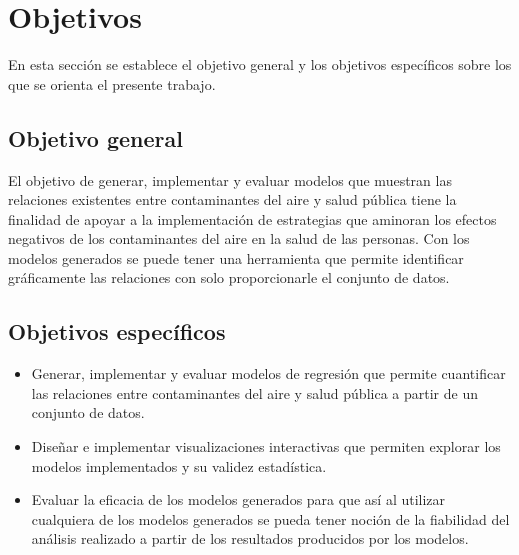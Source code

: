 \section{Objetivos}
En esta sección se establece el objetivo general y los objetivos específicos sobre los que se orienta el presente trabajo.

\subsection{Objetivo general}
El objetivo de generar, implementar y evaluar modelos que muestran las relaciones existentes entre contaminantes del aire y salud pública tiene la finalidad de apoyar a la implementación de estrategias que aminoran los efectos negativos de los contaminantes del aire en la salud de las personas. Con los modelos generados se puede tener una herramienta que permite identificar gráficamente las relaciones con solo proporcionarle el conjunto de datos.

\subsection{Objetivos específicos}
\begin{itemize}
\item Generar, implementar y evaluar modelos de regresión que permite cuantificar las relaciones entre contaminantes del aire y salud pública a partir de un conjunto de datos.
\end{itemize}
\begin{itemize}
\item Diseñar e implementar visualizaciones interactivas que permiten explorar los modelos implementados y su validez estadística.
\end{itemize}
\begin{itemize}
\item Evaluar la eficacia de los modelos generados para que así al utilizar cualquiera de los modelos generados se pueda tener noción de la fiabilidad del análisis realizado a partir de los resultados producidos por los modelos.
\end{itemize}



